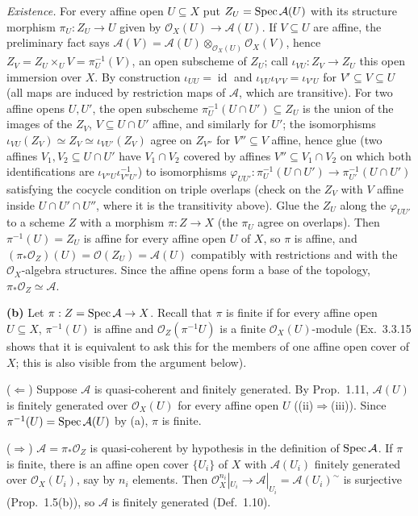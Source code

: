 \documentclass[11pt]{article}
\begin{document}
\emph{Existence.} For every affine open $U\subseteq X$ put $Z_U=\operatorname{Spec}\mathcal A(U)$ with its structure morphism $\pi_U:Z_U\to U$ given by $\mathcal O_X(U)\to\mathcal A(U)$. If $V\subseteq U$ are affine, the preliminary fact says $\mathcal A(V)=\mathcal A(U)\otimes_{\mathcal O_X(U)}\mathcal O_X(V)$, hence $Z_V=Z_U\times_UV=\pi_U^{-1}(V)$, an open subscheme of $Z_U$; call $\iota_{VU}:Z_V\to Z_U$ this open immersion over $X$. By construction $\iota_{UU}=\operatorname{id}$ and $\iota_{VU}\iota_{V'V}=\iota_{V'U}$ for $V'\subseteq V\subseteq U$ (all maps are induced by restriction maps of $\mathcal A$, which are transitive). For two affine opens $U,U'$, the open subscheme $\pi_U^{-1}(U\cap U')\subseteq Z_U$ is the union of the images of the $Z_V$, $V\subseteq U\cap U'$ affine, and similarly for $U'$; the isomorphisms $\iota_{VU}(Z_V)\simeq Z_V\simeq\iota_{VU'}(Z_V)$ agree on $Z_{V''}$ for $V''\subseteq V$ affine, hence glue (two affines $V_1,V_2\subseteq U\cap U'$ have $V_1\cap V_2$ covered by affines $V''\subseteq V_1\cap V_2$ on which both identifications are $\iota_{V''U}\iota_{V''U'}^{-1}$) to isomorphisms $\varphi_{UU'}:\pi_U^{-1}(U\cap U')\to\pi_{U'}^{-1}(U\cap U')$ satisfying the cocycle condition on triple overlaps (check on the $Z_V$ with $V$ affine inside $U\cap U'\cap U''$, where it is the transitivity above). Glue the $Z_U$ along the $\varphi_{UU'}$ to a scheme $Z$ with a morphism $\pi:Z\to X$ (the $\pi_U$ agree on overlaps). Then $\pi^{-1}(U)=Z_U$ is affine for every affine open $U$ of $X$, so $\pi$ is affine, and $(\pi_*\mathcal O_Z)(U)=\mathcal O(Z_U)=\mathcal A(U)$ compatibly with restrictions and with the $\mathcal O_X$-algebra structures. Since the affine opens form a base of the topology, $\pi_*\mathcal O_Z\simeq\mathcal A$.

\textbf{(b)} Let $\pi:Z=\operatorname{Spec}\mathcal A\to X$. Recall that $\pi$ is finite if for every affine open $U\subseteq X$, $\pi^{-1}(U)$ is affine and $\mathcal O_Z(\pi^{-1}U)$ is a finite $\mathcal O_X(U)$-module (Ex.~3.3.15 shows that it is equivalent to ask this for the members of one affine open cover of $X$; this is also visible from the argument below).

($\Leftarrow$) Suppose $\mathcal A$ is quasi-coherent and finitely generated. By Prop.~1.11, $\mathcal A(U)$ is finitely generated over $\mathcal O_X(U)$ for every affine open $U$ ((ii)$\Rightarrow$(iii)). Since $\pi^{-1}(U)=\operatorname{Spec}\mathcal A(U)$ by (a), $\pi$ is finite.

($\Rightarrow$) $\mathcal A=\pi_*\mathcal O_Z$ is quasi-coherent by hypothesis in the definition of $\operatorname{Spec}\mathcal A$. If $\pi$ is finite, there is an affine open cover $\{U_i\}$ of $X$ with $\mathcal A(U_i)$ finitely generated over $\mathcal O_X(U_i)$, say by $n_i$ elements. Then $\mathcal O_X^{n_i}|_{U_i}\to\mathcal A|_{U_i}=\mathcal A(U_i)^\sim$ is surjective (Prop.~1.5(b)), so $\mathcal A$ is finitely generated (Def.~1.10). 
\end{document}
